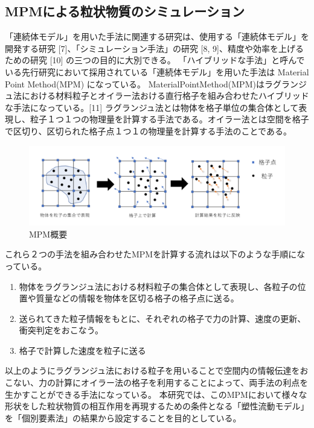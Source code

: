 \documentclass[12pt]{ltjsarticle}
\begin{document}
\subsection{MPMによる粒状物質のシミュレーション}
「連続体モデル」を用いた手法に関連する研究は、使用する「連続体モデル」を開発する研究 [7]、「シミュレーション手法」の研究 [8, 9]、精度や効率を上げるための研究 [10] の三つの目的に大別できる。
「ハイブリッドな手法」と呼んでいる先行研究において採用されている「連続体モデル」を用いた手法は Material Point Method(MPM) になっている。
MaterialPointMethod(MPM)はラグランジュ法における材料粒子とオイラー法おける直行格子を組み合わせたハイブリッドな手法になっている。[11]
ラグランジュ法とは物体を格子単位の集合体として表現し、粒子１つ１つの物理量を計算する手法である。オイラー法とは空間を格子で区切り、区切られた格子点１つ１の物理量を計算する手法のことである。
\begin{figure}[htbp]
  \begin{center}
  \includegraphics*[scale=1.0]{MPM_sample.png}
  \end{center}
\caption{MPM概要}
\end{figure}
これら２つの手法を組み合わせたMPMを計算する流れは以下のような手順になっている。
\begin{enumerate}
\item 物体をラグランジュ法における材料粒子の集合体として表現し、各粒子の位置や質量などの情報を物体を区切る格子の格子点に送る。
\item 送られてきた粒子情報をもとに、それぞれの格子で力の計算、速度の更新、衝突判定をおこなう。
\item 格子で計算した速度を粒子に送る
\end{enumerate}
以上のようにラグランジュ法における粒子を用いることで空間内の情報伝達をおこない、力の計算にオイラー法の格子を利用することによって、両手法の利点を生かすことができる手法になっている。
本研究では、このMPMにおいて様々な形状をした粒状物質の相互作用を再現するための条件となる「塑性流動モデル」を「個別要素法」の結果から設定することを目的としている。
\end{document}
